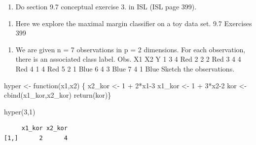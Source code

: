 \documentclass[
  letterpaper,
  DIV=11,
  numbers=noendperiod]{scrartcl}
\newenvironment{Shaded}{\begin{snugshade}}{\end{snugshade}}
\newcommand{\ControlFlowTok}[1]{\textcolor[rgb]{0.00,0.23,0.31}{#1}}
\newcommand{\DecValTok}[1]{\textcolor[rgb]{0.68,0.00,0.00}{#1}}
\newcommand{\FunctionTok}[1]{\textcolor[rgb]{0.28,0.35,0.67}{#1}}
\newcommand{\NormalTok}[1]{\textcolor[rgb]{0.00,0.23,0.31}{#1}}
\newcommand{\OtherTok}[1]{\textcolor[rgb]{0.00,0.23,0.31}{#1}}
\newcommand{\SpecialCharTok}[1]{\textcolor[rgb]{0.37,0.37,0.37}{#1}}
\providecommand{\tightlist}{%
  \setlength{\itemsep}{0pt}\setlength{\parskip}{0pt}}\usepackage{longtable,booktabs,array}
\begin{document}
\begin{enumerate}
\def\labelenumi{(\alph{enumi})}
\tightlist
\item
  Do section 9.7 conceptual exercise 3. in ISL (ISL page 399).
\end{enumerate}

\begin{enumerate}
\def\labelenumi{\arabic{enumi}.}
\setcounter{enumi}{2}
\tightlist
\item
  Here we explore the maximal margin classifier on a toy data set. 9.7
  Exercises 399
\end{enumerate}

\begin{enumerate}
\def\labelenumi{(\alph{enumi})}
\tightlist
\item
  We are given n = 7 observations in p = 2 dimensions. For each
  observation, there is an associated class label. Obs. X1 X2 Y 1 3 4
  Red 2 2 2 Red 3 4 4 Red 4 1 4 Red 5 2 1 Blue 6 4 3 Blue 7 4 1 Blue
  Sketch the observations.
\end{enumerate}

\begin{Shaded}
\begin{Highlighting}[]
\NormalTok{hyper }\OtherTok{\textless{}{-}} \ControlFlowTok{function}\NormalTok{(x1,x2) \{}
\NormalTok{x2\_kor  }\OtherTok{\textless{}{-}} \DecValTok{1} \SpecialCharTok{+} \DecValTok{2}\SpecialCharTok{*}\NormalTok{x1}\DecValTok{{-}3} 
\NormalTok{x1\_kor  }\OtherTok{\textless{}{-}} \DecValTok{1} \SpecialCharTok{+} \DecValTok{3}\SpecialCharTok{*}\NormalTok{x2}\DecValTok{{-}2}
\NormalTok{    kor }\OtherTok{\textless{}{-}} \FunctionTok{cbind}\NormalTok{(x1\_kor,x2\_kor)}
    \FunctionTok{return}\NormalTok{(kor)\}}

\FunctionTok{hyper}\NormalTok{(}\DecValTok{3}\NormalTok{,}\DecValTok{1}\NormalTok{)}
\end{Highlighting}
\end{Shaded}

\begin{verbatim}
     x1_kor x2_kor
[1,]      2      4
\end{verbatim}
\end{document}
